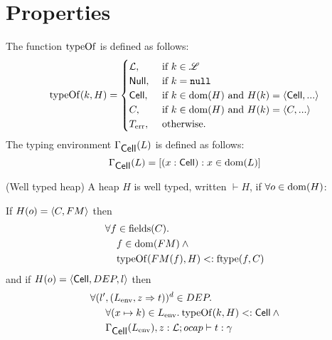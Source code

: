 \section{Properties}
\label{sec:properties}

\begin{definition}
  The function $\mbox{$\mathrm{typeOf}$}$ is defined as follows:
  \begin{equation}
    \mbox{$\mathrm{typeOf}$}{(k, H)} =
    \begin{cases}
      \mbox{$\mathcal{L}$}, &\text{ if }k \in \mbox{$\mathscr{L}$} \\
      \mbox{$\mathsf{Null}$}, &\text{ if }k = \mbox{\mdseries\texttt{null}} \\
      \mbox{$\mathsf{Cell}$}, &\text{ if }k \in \mbox{$\mathrm{dom}$}{(H)}\text{ and } H(k) = \mbox{$\langle \mbox{$\mathsf{Cell}$}{}, ... \rangle$} \\
      C, &\text{ if }k \in \mbox{$\mathrm{dom}$}{(H)}\text{ and } H(k) = \mbox{$\langle C, ... \rangle$} \\
      \mbox{$T_{\text{err}}$}, &\text{ otherwise.}
    \end{cases}
  \end{equation}
  The typing environment $\Gamma_{\mbox{$\mathsf{Cell}$}}(L)$ is defined as follows:
  \begin{equation}
    \Gamma_{\mbox{$\mathsf{Cell}$}}(L) = \left[(x: \mbox{$\mathsf{Cell}$}) : x \in \mbox{$\mathrm{dom}$}(L)\right]
  \end{equation}
\end{definition}


\begin{definition}{(Well typed heap)}
  A heap $H$ is well typed, written $\vdash{H}$, if
  $\forall o \in \mbox{$\mathrm{dom}$}{(H)}$:

  If $H(o) = \mbox{$\langle C, FM \rangle$}$ then
  \begin{equation} \label{eq:defwth1}
    \begin{aligned}
      \forall f &\in \mbox{$\mathrm{fields}$}{(C)}. \\ 
      &f \in \mbox{$\mathrm{dom}$}{(FM)} \: \land \\ 
      &\mbox{$\mathrm{typeOf}$}{(FM(f), H)} <: \mbox{$\mathrm{ftype}$}{(f, C)}
    \end{aligned}
  \end{equation}
  and if $H(o) = \mbox{$\langle \mbox{$\mathsf{Cell}$}{}, DEP, l \rangle$}$ then
  \begin{equation} \label{eq:defwth2}
    \begin{aligned}
      \forall (l'&, (L_{\text{env}}, z \Rightarrow t))^d \in DEP. \\
      &\forall (x \mapsto k) \in L_{\text{env}}.\: \mbox{$\mathrm{typeOf}$}{(k, H)} <:
      \mbox{$\mathsf{Cell}$} \: \land \\
      &\mbox{$\Gamma_{\mbox{$\mathsf{Cell}$}{}}(L_{\text{env}}), z:
      \mbox{$\mathcal{L}$};\mbox{$ocap$}\vdash t:\gamma$} 
    \end{aligned}
  \end{equation}
\end{definition}


